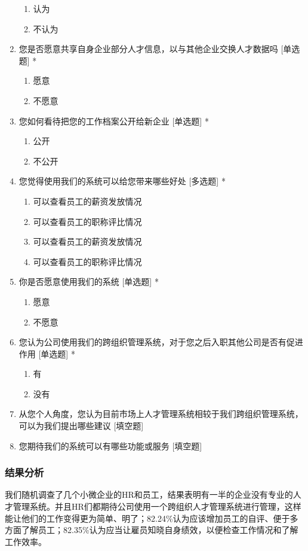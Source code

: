 \documentclass[UTF8]{ctexart}
\begin{document}
\begin{enumerate}[1.]
	\begin{enumerate}
		\item 认为
		\item 不认为
	\end{enumerate}
	\item 您是否愿意共享自身企业部分人才信息，以与其他企业交换人才数据吗 [单选题] *
	\begin{enumerate}
		\item 愿意
		\item 不愿意
	\end{enumerate}
	\item 您如何看待把您的工作档案公开给新企业 [单选题] *
	\begin{enumerate}
		\item 公开
		\item 不公开
	\end{enumerate}
	\item 您觉得使用我们的系统可以给您带来哪些好处 [多选题] *
	\begin{enumerate}
		\item 可以查看员工的薪资发放情况
		\item 可以查看员工的职称评比情况
		\item 可以查看员工的薪资发放情况
		\item 可以查看员工的职称评比情况
	\end{enumerate}
	\item 你是否愿意使用我们的系统 [单选题] *
	\begin{enumerate}
		\item 愿意
		\item 不愿意
	\end{enumerate}
	\item 您认为公司使用我们的跨组织管理系统，对于您之后入职其他公司是否有促进作用 [单选题] *
	\begin{enumerate}
		\item 有
		\item 没有
	\end{enumerate}
	\item 从您个人角度，您认为目前市场上人才管理系统相较于我们跨组织管理系统，可以为我们提出哪些建议 [填空题]
	\item 您期待我们的系统可以有哪些功能或服务 [填空题]
\end{enumerate}
\subsubsection{结果分析}
我们随机调查了几个小微企业的HR和员工，结果表明有一半的企业没有专业的人才管理系统。并且HR们都期待公司使用一个跨组织人才管理系统进行管理，这样能让他们的工作变得更为简单、明了；82.24\%认为应该增加员工的自评、便于多方面了解员工；82.35\%认为应当让雇员知晓自身绩效，以便检查工作情况和了解工作效率。
\end{document}
